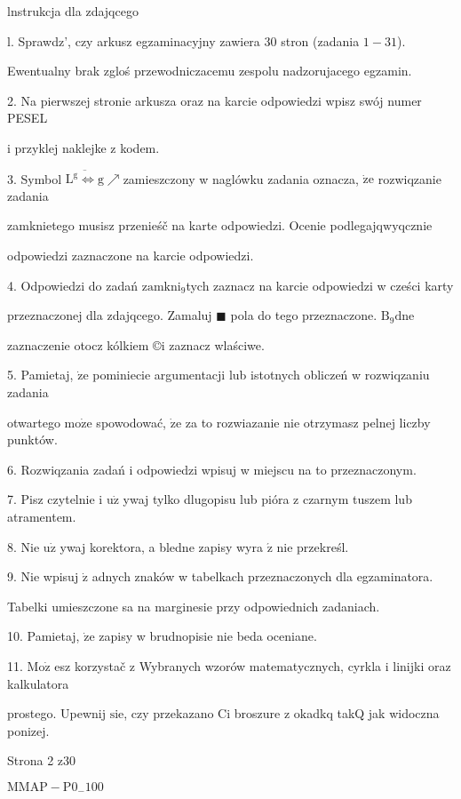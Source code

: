 \documentclass[a4paper,12pt]{article}
\begin{document}
lnstrukcja dla zdajqcego

l. Sprawdz', czy arkusz egzaminacyjny zawiera 30 stron (zadania $1-31$).

Ewentualny brak zgloś przewodniczacemu zespolu nadzorujacego egzamin.

2. Na pierwszej stronie arkusza oraz na karcie odpowiedzi wpisz swój numer PESEL

i przyklej naklejke z kodem.

3. Symbol $\overline{\mathrm{L}^{\mathrm{g}}\Leftrightarrow \mathrm{g}}\nearrow$zamieszczony w naglówku zadania oznacza, $\dot{\mathrm{z}}\mathrm{e}$ rozwiqzanie zadania

zamknietego musisz przenieśč na karte odpowiedzi. Ocenie podlegajq$\mathrm{w}\mathrm{y}$qcznie

odpowiedzi zaznaczone na karcie odpowiedzi.

4. Odpowiedzi do zadań $\mathrm{z}\mathrm{a}\mathrm{m}\mathrm{k}\mathrm{n}\mathrm{i}_{9}$tych zaznacz na karcie odpowiedzi w cześci karty

przeznaczonej dla zdajqcego. Zamaluj $\blacksquare$ pola do tego przeznaczone. $\mathrm{B}_{9}\mathrm{d}\mathrm{n}\mathrm{e}$

zaznaczenie otocz kólkiem \copyright i zaznacz wlaściwe.

5. Pamietaj, $\dot{\mathrm{z}}\mathrm{e}$ pominiecie argumentacji lub istotnych obliczeń w rozwiqzaniu zadania

otwartego $\mathrm{m}\mathrm{o}\dot{\mathrm{z}}\mathrm{e}$ spowodować, $\dot{\mathrm{z}}\mathrm{e}$ za to rozwiazanie nie otrzymasz pelnej liczby punktów.

6. Rozwiqzania zadań i odpowiedzi wpisuj w miejscu na to przeznaczonym.

7. Pisz czytelnie i $\mathrm{u}\dot{\mathrm{z}}$ ywaj tylko dlugopisu lub pióra z czarnym tuszem lub atramentem.

8. Nie $\mathrm{u}\dot{\mathrm{z}}$ ywaj korektora, a bledne zapisy wyra $\acute{\mathrm{z}}$ nie przekreśl.

9. Nie wpisuj $\dot{\mathrm{z}}$ adnych znaków w tabelkach przeznaczonych dla egzaminatora.

Tabelki umieszczone sa na marginesie przy odpowiednich zadaniach.

10. Pamietaj, $\dot{\mathrm{z}}\mathrm{e}$ zapisy w brudnopisie nie beda oceniane.

11. $\mathrm{M}\mathrm{o}\dot{\mathrm{z}}$ esz korzystač z Wybranych wzorów matematycznych, cyrkla i linijki oraz kalkulatora

prostego. Upewnij $\mathrm{s}\mathrm{i}\mathrm{e}$, czy przekazano Ci broszure z $\mathrm{o}\mathrm{k}$adkq takQ jak widoczna ponizej.

Strona 2 z30

$\mathrm{M}\mathrm{M}\mathrm{A}\mathrm{P}-\mathrm{P}0_{-}100$
\end{document}
